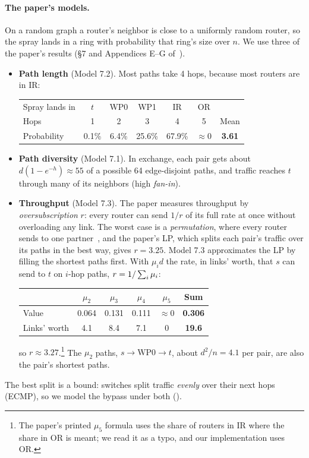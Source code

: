\paragraph{The paper's models.} On a random graph a router's neighbor is close to a uniformly random router, so the spray lands in a ring with probability that ring's size over $n$. We use three of the paper's results (§7 and Appendices E--G of~\cite{rng}).
\begin{itemize}
  \item \textbf{Path length} (Model 7.2). Most paths take 4 hops, because most routers are in IR:
\begin{center}
\small
\begin{tabular}{@{}lccccc|c@{}}
\toprule
Spray lands in & $t$ & WP0 & WP1 & IR & OR & \\
Hops & 1 & 2 & 3 & 4 & 5 & Mean \\
Probability & 0.1\% & 6.4\% & 25.6\% & 67.9\% & $\approx 0$ & \textbf{3.61} \\
\bottomrule
\end{tabular}
\end{center}
  \item \textbf{Path diversity} (Model 7.1). In exchange, each pair gets about $d(1 - e^{-h}) \approx 55$ of a possible 64 edge-disjoint paths, and traffic reaches $t$ through many of its neighbors (high \emph{fan-in}).
  \item \textbf{Throughput} (Model 7.3). The paper measures throughput by \emph{oversubscription} $r$: every router can send $1/r$ of its full rate at once without overloading any link. The worst case is a \emph{permutation}, where every router sends to one partner~\cite{namyar}, and the paper's LP, which splits each pair's traffic over its paths in the best way, gives $r = 3.25$. Model 7.3 approximates the LP by filling the shortest paths first. With $\mu_i d$ the rate, in links' worth, that $s$ can send to $t$ on $i$-hop paths, $r = 1/\textstyle\sum_i \mu_i$:
\begin{center}
\small
\begin{tabular}{@{}lccccc@{}}
\toprule
& $\mu_2$ & $\mu_3$ & $\mu_4$ & $\mu_5$ & Sum \\
\midrule
Value & 0.064 & 0.131 & 0.111 & $\approx 0$ & \textbf{0.306} \\
Links' worth & 4.1 & 8.4 & 7.1 & 0 & \textbf{19.6} \\
\bottomrule
\end{tabular}
\end{center}
  so $r \approx 3.27$.\footnote{The paper's printed $\mu_5$ formula uses the share of routers in IR where the share in OR is meant; we read it as a typo, and our implementation uses OR.} The $\mu_2$ paths, $s \to \text{WP0} \to t$, about $d^2/n = 4.1$ per pair, are also the pair's shortest paths.
\end{itemize}

The best split is a bound: switches split traffic \emph{evenly} over their next hops (ECMP), so we model the bypass under both ().
